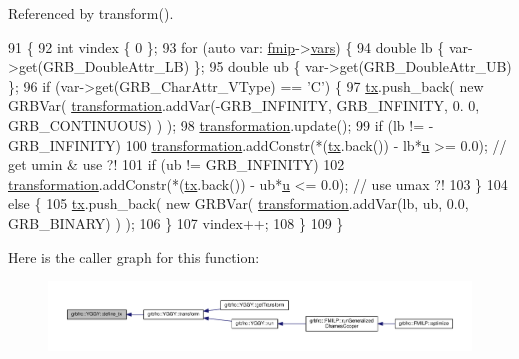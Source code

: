 Referenced by transform().


\begin{DoxyCode}
91                      \{
92     \textcolor{keywordtype}{int} vindex \{ 0 \};
93     \textcolor{keywordflow}{for} (\textcolor{keyword}{auto} var: \hyperlink{classgrbfrc_1_1YGGY_aa4f63c22c95cd48cd87756ebc5de53aa}{fmip}->\hyperlink{classgrbfrc_1_1FMILP_acbf6866651d8b8b18c094302cf2a4284}{vars}) \{
94         \textcolor{keywordtype}{double} lb \{ var->get(GRB\_DoubleAttr\_LB) \};
95         \textcolor{keywordtype}{double} ub \{ var->get(GRB\_DoubleAttr\_UB) \};
96         \textcolor{keywordflow}{if} (var->get(GRB\_CharAttr\_VType) == \textcolor{charliteral}{'C'}) \{
97             \hyperlink{classgrbfrc_1_1YGGY_a1c58fb733dc53d1bf8823623aaf297f8}{tx}.push\_back( \textcolor{keyword}{new} GRBVar( \hyperlink{classgrbfrc_1_1YGGY_a6f528d327b9dfbe474d357afe8a3d518}{transformation}.addVar(-GRB\_INFINITY, GRB\_INFINITY, 0.
      0, GRB\_CONTINUOUS) ) );
98             \hyperlink{classgrbfrc_1_1YGGY_a6f528d327b9dfbe474d357afe8a3d518}{transformation}.update();
99             \textcolor{keywordflow}{if} (lb != -GRB\_INFINITY)
100                 \hyperlink{classgrbfrc_1_1YGGY_a6f528d327b9dfbe474d357afe8a3d518}{transformation}.addConstr(*(\hyperlink{classgrbfrc_1_1YGGY_a1c58fb733dc53d1bf8823623aaf297f8}{tx}.back()) - lb*\hyperlink{classgrbfrc_1_1YGGY_a1c24782afe02686a8eabc59b829cdec0}{u} >= 0.0);  \textcolor{comment}{// get umin & use
       ?!}
101             \textcolor{keywordflow}{if} (ub != GRB\_INFINITY)
102                 \hyperlink{classgrbfrc_1_1YGGY_a6f528d327b9dfbe474d357afe8a3d518}{transformation}.addConstr(*(\hyperlink{classgrbfrc_1_1YGGY_a1c58fb733dc53d1bf8823623aaf297f8}{tx}.back()) - ub*\hyperlink{classgrbfrc_1_1YGGY_a1c24782afe02686a8eabc59b829cdec0}{u} <= 0.0);  \textcolor{comment}{// use umax ?!}
103         \}
104         \textcolor{keywordflow}{else} \{
105             \hyperlink{classgrbfrc_1_1YGGY_a1c58fb733dc53d1bf8823623aaf297f8}{tx}.push\_back( \textcolor{keyword}{new} GRBVar( \hyperlink{classgrbfrc_1_1YGGY_a6f528d327b9dfbe474d357afe8a3d518}{transformation}.addVar(lb, ub, 0.0, GRB\_BINARY) ) );
106         \}
107         vindex++;
108     \}
109 \}
\end{DoxyCode}


Here is the caller graph for this function\+:
\nopagebreak
\begin{figure}[H]
\begin{center}
\leavevmode
\includegraphics[width=350pt]{classgrbfrc_1_1YGGY_a15b9f6f722a0b9cd36e540aca58ba483_icgraph}
\end{center}
\end{figure}


